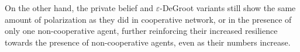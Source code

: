 \documentclass[a4paper, 12pt]{report}
\begin{document}
\noindent On the other hand, the private belief and $\varepsilon$-DeGroot variants still show the same amount of polarization as they did in cooperative network, or in the presence of only one non-cooperative agent, further reinforcing their increased resilience towards the presence of non-cooperative agents, even as their numbers increase.

\begin{figure}[!htbp]
    \centering
    

\end{figure}
\end{document}

